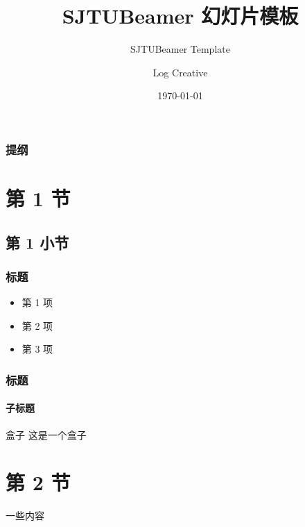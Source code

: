 \documentclass{beamer}
\title{\textsf{SJTUBeamer} 幻灯片模板}
\subtitle{SJTUBeamer Template}
\author{Log Creative}
\institute[]{github.com/LogCreative}
\date{\today}
\begin{document}
    

    \sjtutitle

    \begin{frame}
        \frametitle{提纲}
        \tableofcontents
    \end{frame}

    \section{第 1 节}
    \subsection{第 1 小节}
    \begin{frame}
        \frametitle{标题}

        \begin{itemize}
            \item 第 1 项
            \item 第 2 项
            \item 第 3 项
        \end{itemize}

    \end{frame}

    \begin{frame}
        \frametitle{标题}
        \framesubtitle{子标题}

        \begin{block}{盒子}
            这是一个盒子
        \end{block}
    \end{frame}

    \section{第 2 节}
    \begin{frame}
        一些内容
    \end{frame}
\end{document}
